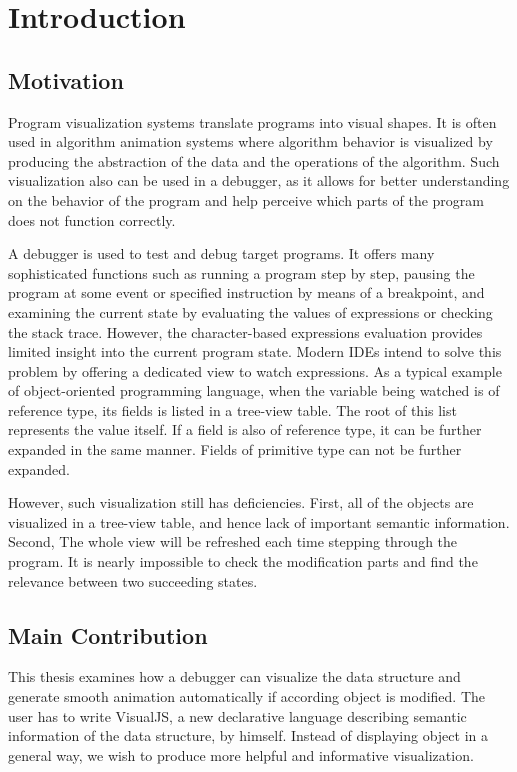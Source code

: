 \chapter {Introduction}

\section {Motivation}
Program visualization systems translate programs into visual shapes. It is often used in algorithm animation systems where algorithm behavior is visualized by producing the abstraction of the data and the operations of the algorithm. Such visualization also can be used in a debugger, as it allows for better understanding on the behavior of the program and help perceive which parts of the program does not function correctly.

A debugger is used to test and debug target programs. It offers many sophisticated functions such as running a program step by step, pausing the program at some event or specified instruction by means of a breakpoint, and examining the current state by evaluating the values of expressions or checking the stack trace. However, the character-based expressions evaluation provides limited insight into the current program state. Modern IDEs intend to solve this problem by offering a dedicated view to watch expressions. As a typical example of object-oriented programming language, when the variable being watched is of reference type, its fields is listed in a tree-view table. The root of this list represents the value itself. If a field is also of reference type, it can be further expanded in the same manner. Fields of primitive type can not be further expanded.

However, such visualization still has deficiencies. First, all of the objects are visualized in a tree-view table, and hence lack of important semantic information. Second, The whole view will be refreshed each time stepping through the program. It is nearly impossible to check the modification parts and find the relevance between two succeeding states.

\section {Main Contribution}
This thesis examines how a debugger can visualize the data structure and generate smooth animation automatically if according object is modified. The user has to write VisualJS, a new declarative language describing semantic information of the data structure, by himself. Instead of displaying object in a general way, we wish to produce more helpful and informative visualization.

